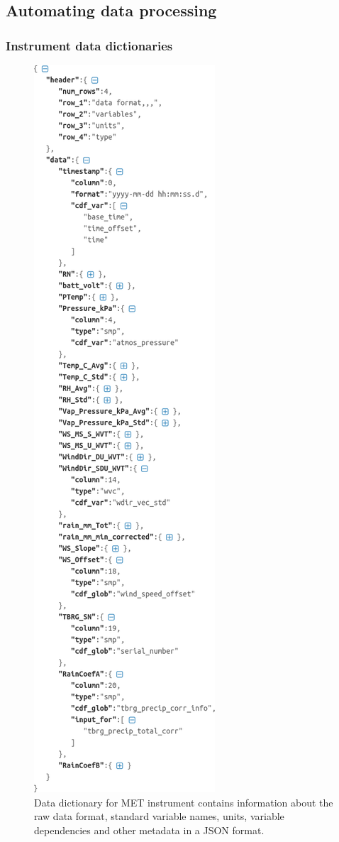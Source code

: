 \subsection{Automating data processing}

\subsubsection{Instrument data dictionaries}
\begin{figure}
 \includegraphics[width=0.5\columnwidth]{figures/met_dict.png}
 \caption{Data dictionary for MET instrument contains information about
	 the raw data format, standard variable names, units, variable dependencies
	 and other metadata in a JSON format.}
 \label{fig:met_dict}
\end{figure}

